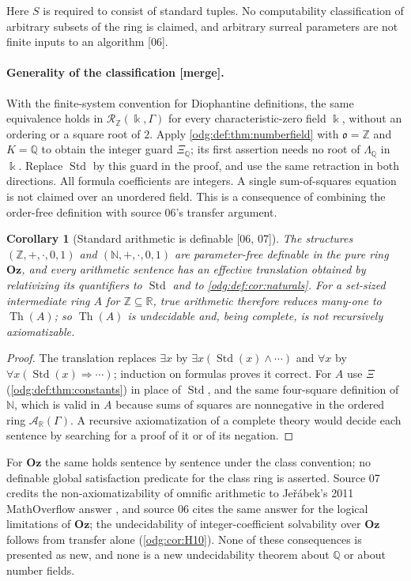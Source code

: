 \documentclass[11pt,oneside]{article}
\numberwithin{equation}{section}
\newtheorem{corollary}[corollary]{Corollary}
\theoremstyle{definition}
\theoremstyle{remark}
\newcommand{\Oz}{\mathbf{Oz}}
\newcommand{\Z}{\mathbb Z}
\newcommand{\Q}{\mathbb Q}
\newcommand{\R}{\mathbb R}
\newcommand{\N}{\mathbb N}
\newcommand{\Std}{\operatorname{Std}}
\newcommand{\src}[1]{\textup{\textsf{\small[#1]}}}
\newcommand{\mergetag}{\textup{\textsf{\small[merge]}}}
\newcommand{\Th}{\operatorname{Th}}
\begin{document}
Here $S$ is required to consist of standard tuples. No computability
classification of arbitrary subsets of the ring is claimed, and arbitrary
surreal parameters are not finite inputs to an algorithm \src{06}.

\paragraph{Generality of the classification \mergetag.}
With the finite-system convention for Diophantine definitions, the same
equivalence holds in $\mathcal R_\Z(\Bbbk,\Gamma)$ for every characteristic-zero
field $\Bbbk$, without an ordering or a square root of $2$. Apply
\cref{odg:def:thm:numberfield} with $\mathfrak o=\Z$ and $K=\Q$ to obtain
the integer guard $\Xi_\Q$; its first assertion needs no root of
$\Lambda_\Q$ in $\Bbbk$. Replace $\Std$ by this guard in the proof, and use
the same retraction in both directions. All formula coefficients are
integers. A single sum-of-squares equation is not claimed over an
unordered field. This is a consequence of combining the order-free
definition with source 06's transfer argument.

\begin{corollary}[Standard arithmetic is definable \src{06, 07}]\label{odg:def:cor:arithmetic}
The structures $(\Z,+,\cdot,0,1)$ and $(\N,+,\cdot,0,1)$ are parameter-free
definable in the pure ring $\Oz$, and every arithmetic sentence has an
effective translation obtained by relativizing its quantifiers to $\Std$ and
to \cref{odg:def:cor:naturals}. For a set-sized intermediate ring $A$ for
$\Z\subseteq\R$, true arithmetic therefore reduces many-one to $\Th(A)$; so
$\Th(A)$ is undecidable and, being complete, is not recursively axiomatizable.
\end{corollary}
\begin{proof}
The translation replaces $\exists x$ by $\exists x(\Std(x)\wedge\cdots)$ and
$\forall x$ by $\forall x(\Std(x)\Rightarrow\cdots)$; induction on formulas
proves it correct. For $A$ use $\Xi$ (\cref{odg:def:thm:constants}) in place
of $\Std$, and the same four-square definition of $\N$, which is valid in $A$
because sums of squares are nonnegative in the ordered ring
$\mathcal A_\R(\Gamma)$. A recursive
axiomatization of a complete theory would decide each sentence by searching for
a proof of it or of its negation.
\end{proof}

For $\Oz$ the same holds sentence by sentence under the class convention;
no definable global satisfaction predicate for the class ring is asserted.
Source 07 credits the non-axiomatizability of omnific arithmetic to
Je\v r\'abek's 2011 MathOverflow answer \cite{JerabekMO}, and source 06 cites
the same answer for the logical limitations of $\Oz$; the undecidability of
integer-coefficient solvability over $\Oz$ follows from transfer alone
(\cref{odg:cor:H10}). None of these consequences is presented as new, and none
is a new undecidability theorem about $\Q$ or about number fields.
\end{document}
